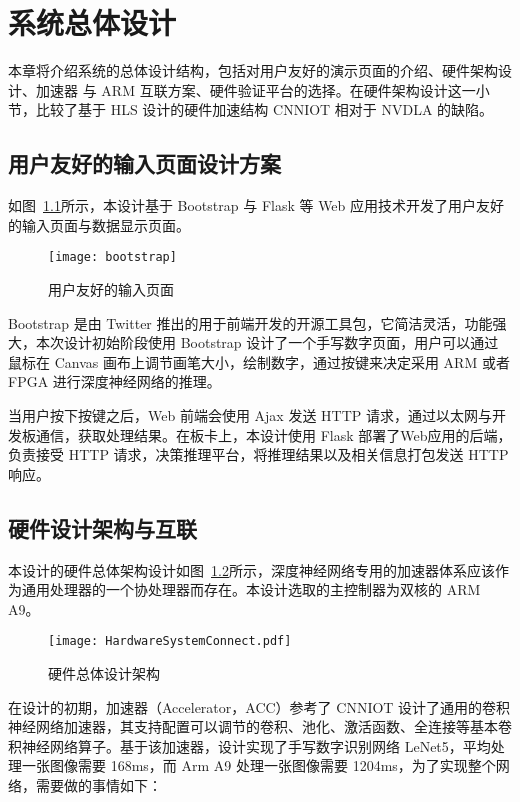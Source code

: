 \chapter{系统总体设计}\label{chap:systemoveral}

本章将介绍系统的总体设计结构，包括对用户友好的演示页面的介绍、硬件架构设计、加速器 与 ARM 互联方案、硬件验证平台的选择。在硬件架构设计这一小节，比较了基于 HLS 设计的硬件加速结构 CNNIOT 相对于 NVDLA 的缺陷。

\section{用户友好的输入页面设计方案}

如图~\ref{fig:BootStrap}所示，本设计基于 Bootstrap 与 Flask 等 Web 应用技术开发了用户友好的输入页面与数据显示页面。

\begin{figure}[!htbp]
    \centering
    \texttt{[image: bootstrap]}
    \caption{用户友好的输入页面}
    \label{fig:BootStrap}
\end{figure}

Bootstrap 是由 Twitter 推出的用于前端开发的开源工具包，它简洁灵活，功能强大，本次设计初始阶段使用 Bootstrap 设计了一个手写数字页面，用户可以通过鼠标在 Canvas 画布上调节画笔大小，绘制数字，通过按键来决定采用 ARM 或者 FPGA 进行深度神经网络的推理。

当用户按下按键之后，Web 前端会使用 Ajax 发送 HTTP 请求，通过以太网与开发板通信，获取处理结果。在板卡上，本设计使用 Flask 部署了Web应用的后端，负责接受 HTTP 请求，决策推理平台，将推理结果以及相关信息打包发送 HTTP 响应。

\section{硬件设计架构与互联}

本设计的硬件总体架构设计如图~\ref{fig:Hardware System Connect}所示，深度神经网络专用的加速器体系应该作为通用处理器的一个协处理器而存在。本设计选取的主控制器为双核的 ARM A9。

\begin{figure}[!htbp]
    \centering
    \texttt{[image: HardwareSystemConnect.pdf]}
    \caption{硬件总体设计架构}
    \label{fig:Hardware System Connect}
\end{figure}

在设计的初期，加速器（Accelerator，ACC）参考了 CNNIOT 设计了通用的卷积神经网络加速器，其支持配置可以调节的卷积、池化、激活函数、全连接等基本卷积神经网络算子。基于该加速器，设计实现了手写数字识别网络 LeNet5，平均处理一张图像需要 168ms，而 Arm A9 处理一张图像需要 1204ms，为了实现整个网络，需要做的事情如下：

